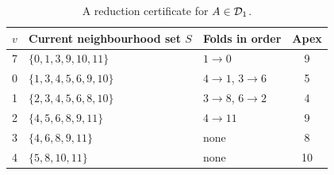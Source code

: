 \begin{table}[H]
\centering\small\setlength{\tabcolsep}{4pt}
\caption{A reduction certificate for \(A\in\mathcal D_1\).}\label{6k6:tab:Apos}
\begin{tabular}{c p{} p{} c}
\toprule
$v$ & Current neighbourhood set $S$ & Folds in order & Apex\\
\midrule

7 & \(\{0,1,3,9,10,11\}\) & \(1\to 0\) & 9\\
0 & \(\{1,3,4,5,6,9,10\}\) & \(4\to 1\), \(3\to 6\) & 5\\
1 & \(\{2,3,4,5,6,8,10\}\) & \(3\to 8\), \(6\to 2\) & 4\\
2 & \(\{4,5,6,8,9,11\}\) & \(4\to 11\) & 9\\
3 & \(\{4,6,8,9,11\}\) & none & 8\\
4 & \(\{5,8,10,11\}\) & none & 10\\
\bottomrule
\end{tabular}
\end{table}
